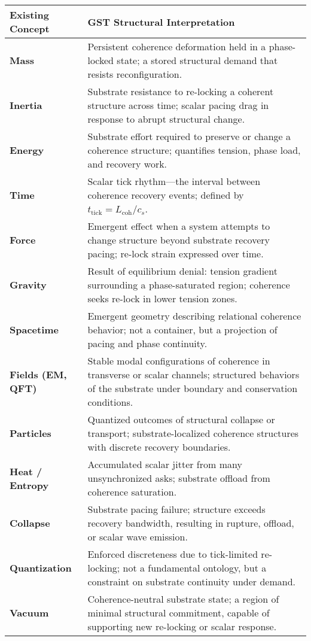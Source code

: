 \documentclass[entropy,article,submit,pdftex,moreauthors]{Definitions/mdpi}
\begin{document}
\renewcommand{\arraystretch}{1.3}
\begin{center}
\begin{tabular}{|p{4cm}|p{7.8cm}|}
\hline
\textbf{Existing Concept} & \textbf{GST Structural Interpretation} \\
\hline
\textbf{Mass} & Persistent coherence deformation held in a phase-locked state; a stored structural demand that resists reconfiguration. \\
\hline
\textbf{Inertia} & Substrate resistance to re-locking a coherent structure across time; scalar pacing drag in response to abrupt structural change. \\
\hline
\textbf{Energy} & Substrate effort required to preserve or change a coherence structure; quantifies tension, phase load, and recovery work. \\
\hline
\textbf{Time} & Scalar tick rhythm—the interval between coherence recovery events; defined by \( t_{\text{tick}} = L_{\text{coh}} / c_s \). \\
\hline
\textbf{Force} & Emergent effect when a system attempts to change structure beyond substrate recovery pacing; re-lock strain expressed over time. \\
\hline
\textbf{Gravity} & Result of equilibrium denial: tension gradient surrounding a phase-saturated region; coherence seeks re-lock in lower tension zones. \\
\hline
\textbf{Spacetime} & Emergent geometry describing relational coherence behavior; not a container, but a projection of pacing and phase continuity. \\
\hline
\textbf{Fields (EM, QFT)} & Stable modal configurations of coherence in transverse or scalar channels; structured behaviors of the substrate under boundary and conservation conditions. \\
\hline
\textbf{Particles} & Quantized outcomes of structural collapse or transport; substrate-localized coherence structures with discrete recovery boundaries. \\
\hline
\textbf{Heat / Entropy} & Accumulated scalar jitter from many unsynchronized asks; substrate offload from coherence saturation. \\
\hline
\textbf{Collapse} & Substrate pacing failure; structure exceeds recovery bandwidth, resulting in rupture, offload, or scalar wave emission. \\
\hline
\textbf{Quantization} & Enforced discreteness due to tick-limited re-locking; not a fundamental ontology, but a constraint on substrate continuity under demand. \\
\hline
\textbf{Vacuum} & Coherence-neutral substrate state; a region of minimal structural commitment, capable of supporting new re-locking or scalar response. \\
\hline
\end{tabular}
\end{center}
\end{document}
